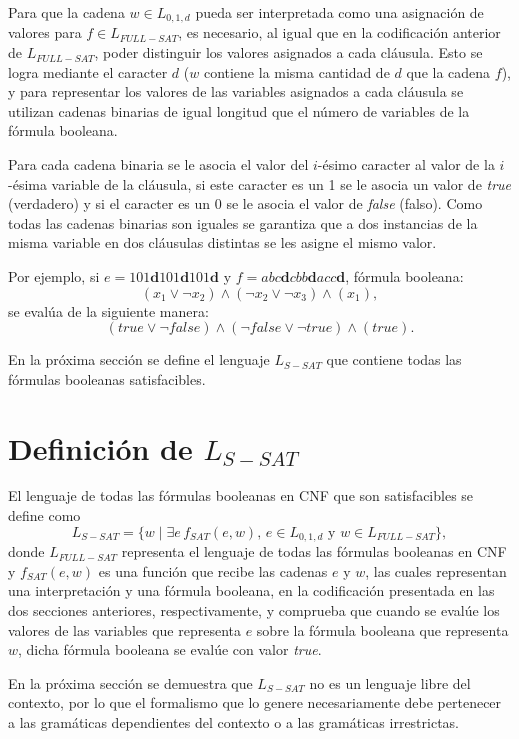 \documentclass[12pt]{article}
\newcommand{\true}{\textit{true}}
\newcommand{\false}{\textit{false}}
\begin{document}
Para que la cadena $w\in L_{0,1,d}$ pueda ser interpretada como una asignación de valores para $f\in L_{FULL-SAT}$, 
es necesario, al igual que en la codificación anterior de $L_{FULL-SAT}$, poder distinguir los valores asignados 
a cada cláusula. Esto se logra mediante el caracter $d$ ($w$ contiene la misma cantidad de $d$ que la cadena $f$), y para representar los valores de las variables asignados a cada cláusula se utilizan 
cadenas binarias de igual longitud que el número de variables de la fórmula booleana.

Para cada cadena binaria se le asocia el valor del $i$-ésimo caracter al valor de la $i$-ésima variable de la 
cláusula, si este caracter es un 1 se le asocia un valor de \true{} (verdadero) y si el caracter es un 0 
se le asocia el valor de \false{} (falso). Como todas las cadenas binarias son iguales
se garantiza que a dos instancias de la misma variable en dos cláusulas distintas se les asigne el 
mismo valor.


Por ejemplo, si $e=101\mathbf{d}101\mathbf{d}101\mathbf{d}$ y $f=abc\mathbf{d}cbb\mathbf{d}acc\mathbf{d}$, fórmula booleana:
$$(x_1\vee\neg x_2)\wedge (\neg x_2 \vee \neg x_3)\wedge (x_1),$$
se evalúa de la siguiente manera:
$$(true\vee\neg false)\wedge (\neg false \vee \neg true)\wedge (true).$$

En la próxima sección se define el lenguaje $L_{S-SAT}$ que contiene todas las fórmulas booleanas satisfacibles.

\section{Definición de $L_{S-SAT}$}

El lenguaje de todas las fórmulas booleanas en CNF que son satisfacibles se define como $$L_{S-SAT}=\{w \mid \exists e\,f_{SAT}(e,w),\,e\in L_{0,1,d}\text{ y }w \in L_{FULL-SAT} \},$$ donde $L_{FULL-SAT}$ representa el lenguaje de todas las fórmulas booleanas en CNF y $f_{SAT}(e,w)$
es una función que recibe las cadenas $e$ y $w$, las cuales representan una interpretación y una fórmula booleana, en la codificación
presentada en las dos secciones anteriores, respectivamente, y comprueba que cuando se evalúe los valores de las variables
que representa $e$ sobre la fórmula booleana que representa $w$, dicha fórmula booleana se evalúe con valor \true{}.


En la próxima sección se demuestra que $L_{S-SAT}$ no es un lenguaje libre del contexto, por lo que el formalismo que lo
genere necesariamente debe pertenecer a las gramáticas dependientes del contexto o a las gramáticas irrestrictas.
\end{document}
